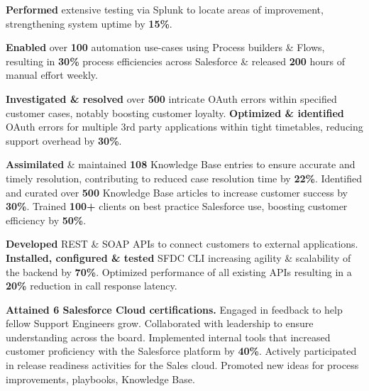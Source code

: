 \documentclass[]{prakhar-resume-version-2}
\begin{document}
\begin{minipage}[t]{0.66\textwidth}
\begin{itemize}
{\vspace{-1.5mm}
\item \textbf{Performed} extensive testing via Splunk to locate areas of improvement, strengthening system uptime by \textbf{15\%}.
\vspace{-1.5mm}
\item  \textbf{Enabled} over \textbf{100} automation use-cases using Process builders \& Flows, resulting in \textbf{30\%} process efficiencies across Salesforce \& released \textbf{200} hours of manual effort weekly.
\vspace{-1.5mm}
\item \textbf{Investigated \& resolved} over \textbf{500} intricate OAuth errors within specified customer cases, notably boosting customer loyalty. \textbf{Optimized \& identified} OAuth errors for multiple 3rd party applications within tight timetables, reducing support overhead by \textbf{30\%}.
\vspace{-1.5mm}
\item \textbf{Assimilated} \& maintained \textbf{108} Knowledge Base entries to ensure accurate and timely resolution, contributing to reduced case resolution time by \textbf{22\%}. Identified and curated over \textbf{500} Knowledge Base articles to increase customer success by \textbf{30\%}. Trained \textbf{100+} clients on best practice Salesforce use, boosting customer efficiency by \textbf{50\%}. 
\vspace{-1.5mm}
\item \textbf{Developed} REST \& SOAP APIs to connect customers to external applications. \textbf{Installed, configured \& tested} SFDC CLI increasing agility \& scalability of the backend by \textbf{70\%}. Optimized performance of all existing APIs resulting in a \textbf{20\%} reduction in call response latency.
\vspace{-1.5mm}
\item \textbf{Attained 6 Salesforce Cloud certifications.} Engaged in feedback to help fellow Support Engineers grow. Collaborated with leadership to ensure understanding across the board. Implemented internal tools that increased customer proficiency with the Salesforce platform by \textbf{40\%}. Actively participated in release readiness activities for the Sales cloud. Promoted new ideas for process improvements, playbooks, Knowledge Base.
}
\end{itemize}
\sectionsep


\end{minipage}
\end{document}
